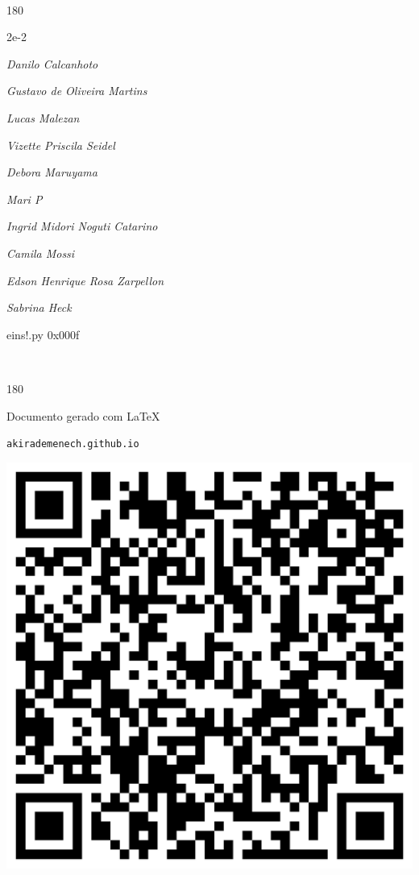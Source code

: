 \documentclass[12pt]{article}
\begin{document}
	\ 
	\vfill
	\begin{turn}{180}	
		\begin{minipage}{\textwidth}
		  	\ttfamily %
			\centering
			{\Huge 2e-2}
		  
			\hfill
		  
			

\textit{\small Danilo Calcanhoto}

\textit{\small Gustavo de Oliveira Martins}

\textit{\small Lucas Malezan}

\textit{\small Vizette Priscila Seidel}

\textit{\small Debora Maruyama}

\textit{\small Mari P}

\textit{\small Ingrid Midori Noguti Catarino}

\textit{\small Camila Mossi}

\textit{\small Edson Henrique Rosa Zarpellon}

\textit{\small Sabrina Heck}

\bigskip

eins!.py
0x000f


		\end{minipage}	
	\end{turn}
	\vfill
	\

\pagebreak

	\begin{turn}{180}	
		\begin{minipage}{\textwidth}		  
		  Documento gerado com \LaTeX			
		  
		  \texttt{akirademenech.github.io}

		  \includegraphics[height=0.3\textheight]{2e-2.pdf}

		\end{minipage}	
	\end{turn}  
		  
\end{document}
